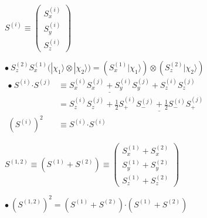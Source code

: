 \documentclass[12pt]{article}
\newcommand{\dotP}{\boldsymbol \cdot}		%
\begin{document}
\vspace{10pt} \noindent
\begin{minipage}[t]{.5\textwidth}
    \begin{center} \( 
        S^{(i)} \equiv 
        \left( \begin{matrix} 
            S^{(i)}_x\\[5pt] 
            S^{(i)}_y\\[5pt] 
            S^{(i)}_z 
        \end{matrix}\right) 
    \) \end{center}
        
    \( 
        \bullet \ S^{(2)}_z S^{(1)}_x \Big( | \chi_1 \rangle \otimes | \chi_2 \rangle \Big)
        = \left( S^{(1)}_x | \chi_1 \rangle \right) \otimes \left( S^{(2)}_z | \chi_2 \rangle \right) 
    \)\\[10pt]
    \( \begin{aligned}
        \bullet \ S^{(i)} \dotP S^{(j)} & \equiv \underline{ S^{(i)}_x S^{(j)}_x + S^{(i)}_y S^{(j)}_y } + S^{(i)}_z S^{(j)}_z \\[5pt]
        & = S^{(i)}_z S^{(j)}_z + \underline{ \tfrac{1}{2} S^{(i)}_+ S^{(j)}_- + \tfrac{1}{2} S^{(i)}_- S^{(j)}_+ }
            \\[5pt]
        ( S^{(i)} )^2 & \equiv S^{(i)} \dotP S^{(i)} 
    \end{aligned}\)
\end{minipage}
\hfill\vline\hfill
\begin{minipage}[t]{.45\textwidth}
    \begin{center} \( 
        S^{(1,2)} \equiv \left( S^{(1)} + S^{(2)} \right) \equiv 
        \left( \begin{matrix} S^{(1)}_x + S^{(2)}_x \\[5pt]
            S^{(1)}_y + S^{(2)}_y \\[5pt]
            S^{(1)}_z + S^{(2)}_z 
        \end{matrix} \right) 
    \) \end{center}

    \( \bullet \ \left( S^{(1,2)} \right)^2 =
        \left( S^{(1)} + S^{(2)} \right) \dotP \left( S^{(1)} + S^{(2)} \right) \)
\end{minipage}
\end{document}
